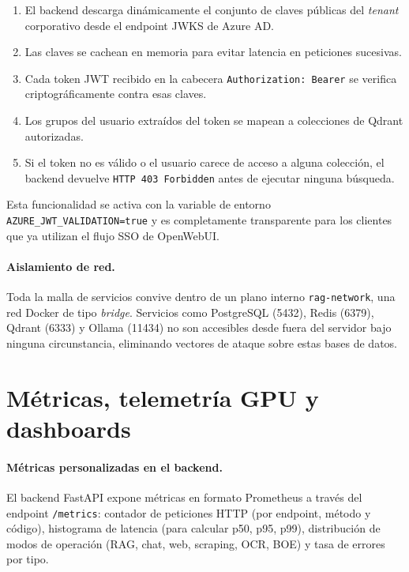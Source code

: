 \begin{enumerate}
    \item El backend descarga dinámicamente el conjunto de claves públicas del \textit{tenant} corporativo desde el endpoint JWKS de Azure AD.
    \item Las claves se cachean en memoria para evitar latencia en peticiones sucesivas.
    \item Cada token JWT recibido en la cabecera \texttt{Authorization: Bearer} se verifica criptográficamente contra esas claves.
    \item Los grupos del usuario extraídos del token se mapean a colecciones de Qdrant autorizadas.
    \item Si el token no es válido o el usuario carece de acceso a alguna colección, el backend devuelve \texttt{HTTP 403 Forbidden} antes de ejecutar ninguna búsqueda.
\end{enumerate}

Esta funcionalidad se activa con la variable de entorno \texttt{AZURE\_JWT\_VALIDATION=true} y es completamente transparente para los clientes que ya utilizan el flujo SSO de OpenWebUI.

\paragraph{Aislamiento de red.} Toda la malla de servicios convive dentro de un plano interno \texttt{rag-network}, una red Docker de tipo \textit{bridge}. Servicios como PostgreSQL (5432), Redis (6379), Qdrant (6333) y Ollama (11434) no son accesibles desde fuera del servidor bajo ninguna circunstancia, eliminando vectores de ataque sobre estas bases de datos.

\section{Métricas, telemetría GPU y dashboards}
\label{anexo:observabilidad}

\paragraph{Métricas personalizadas en el backend.} El backend FastAPI expone métricas en formato Prometheus a través del endpoint \texttt{/metrics}: contador de peticiones HTTP (por endpoint, método y código), histograma de latencia (para calcular p50, p95, p99), distribución de modos de operación (RAG, chat, web, scraping, OCR, BOE) y tasa de errores por tipo.

